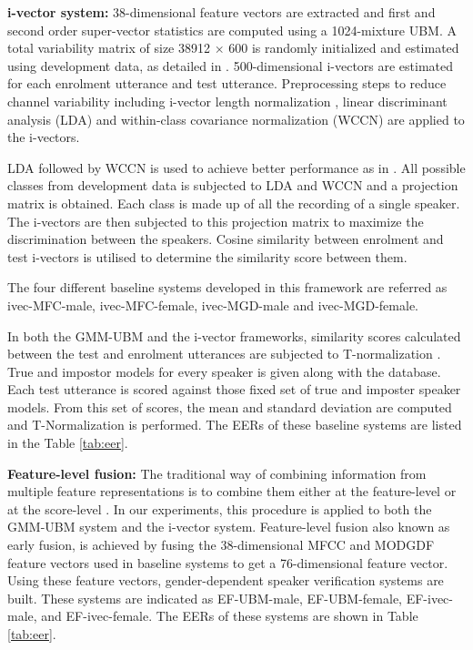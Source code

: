 \documentclass{article}
\begin{document}
\textbf{i-vector system:} 
38-dimensional feature vectors are extracted and first and
 second order super-vector statistics are computed using a
 1024-mixture UBM. A total variability matrix of size 38912
 $\times$ 600 is randomly initialized and estimated using
 development data, as detailed in \cite{dehak_ivector, kenny_JFA}. 
500-dimensional i-vectors are estimated for each enrolment
utterance and test utterance. Preprocessing steps to reduce
channel variability including i-vector length normalization
\cite{garciaRomero}, linear discriminant analysis (LDA) and
within-class covariance normalization (WCCN) are applied to the
i-vectors.

LDA followed by WCCN is used to achieve better performance as in \cite{dehak_ivector}. 
All possible classes from development data is subjected to LDA and WCCN and a projection
matrix is obtained. Each class is made up of all the recording of a single speaker. The 
i-vectors are then subjected to this projection matrix to maximize the discrimination
between the speakers. Cosine similarity between enrolment and test i-vectors is 
utilised to determine the similarity score between them.

The four different baseline systems developed in this framework
are referred as ivec-MFC-male, ivec-MFC-female, ivec-MGD-male
and ivec-MGD-female.

In both the GMM-UBM and the i-vector frameworks, similarity
scores calculated between the test and enrolment utterances 
are subjected to T-normalization \cite{tnorm}. True and impostor
models for every speaker is given along with the database. Each 
test utterance is scored against those fixed set of true and imposter 
speaker models. From this set of scores, the mean and standard
deviation are computed and T-Normalization is performed. The 
EERs of these baseline systems are listed in the Table \ref{tab:eer}.


\textbf{Feature-level fusion:} The traditional way of combining
information from multiple feature representations is to combine
them either at the feature-level or at the score-level \cite{fusion}. 
In our experiments, this procedure is applied to both the GMM-UBM system
and the i-vector system. Feature-level fusion also known as early fusion,
is achieved by fusing the 38-dimensional MFCC and MODGDF feature vectors 
used in baseline systems to get a 76-dimensional feature vector. Using these
feature vectors, gender-dependent speaker verification systems
 are built. These systems are indicated as EF-UBM-male, EF-UBM-female, 
 EF-ivec-male, and EF-ivec-female. The EERs of these systems are shown in 
 Table  \ref{tab:eer}.
\end{document}
